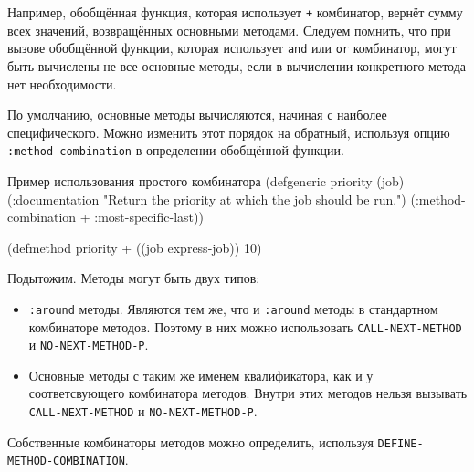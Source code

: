 Например, обобщённая функция, которая использует \lstinline{+} комбинатор, вернёт сумму всех значений, возвращённых основными методами. Следуем помнить, что при вызове обобщённой функции, которая использует \lstinline{and} или \lstinline{or} комбинатор, могут быть вычислены не все основные методы, если в вычислении конкретного метода нет необходимости.

По умолчанию, основные методы вычисляются, начиная с наиболее специфического. Можно изменить этот порядок на обратный, используя опцию \lstinline{:method-combination} в определении обобщённой функции.

\begin{cllst}{Пример использования простого комбинатора}{}
(defgeneric priority (job)
  (:documentation "Return the priority at which the job should be run.")
  (:method-combination + :most-specific-last))

(defmethod priority + ((job express-job)) 10)
\end{cllst}

Подытожим. Методы могут быть двух типов:
\begin{itemize}
  \item \lstinline{:around} методы. Являются тем же, что и \lstinline{:around} методы в стандартном комбинаторе методов. Поэтому в них можно использовать \lstinline{CALL-NEXT-METHOD} и \lstinline{NO-NEXT-METHOD-P}.
  \item Основные методы с таким же именем квалификатора, как и у соответсвующего комбинатора методов. Внутри этих методов нельзя вызывать \lstinline{CALL-NEXT-METHOD} и \lstinline{NO-NEXT-METHOD-P}.
\end{itemize}

Собственные комбинаторы методов можно определить, используя \lstinline{DEFINE-METHOD-COMBINATION}.
